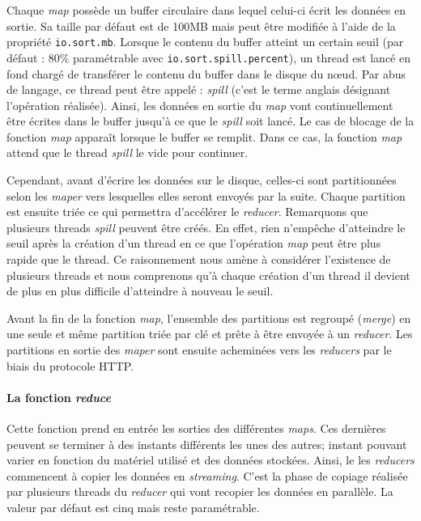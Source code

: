 \par Chaque \textit{map} possède un buffer circulaire dans lequel celui-ci écrit les données en sortie. Sa taille par défaut est de 100MB mais peut être modifiée à l'aide de la propriété \texttt{io.sort.mb}. Lorsque le contenu du buffer atteint un certain seuil (par défaut : 80\% paramétrable avec \texttt{io.sort.spill.percent}), un thread est lancé en fond chargé de transférer le contenu du buffer dans le disque du n\oe{}ud. Par abus de langage, ce thread peut être appelé : \textit{spill} (c'est le terme anglais désignant l'opération réalisée). Ainsi, les données en sortie du \textit{map} vont continuellement être écrites dans le buffer jusqu'à ce que le \textit{spill} soit lancé. Le cas de blocage de la fonction \textit{map} apparaît lorsque le buffer se remplit. Dans ce cas, la fonction \textit{map} attend que le thread \textit{spill} le vide pour continuer.

\par Cependant, avant d'écrire les données sur le disque, celles-ci sont partitionnées selon les \textit{maper} vers lesquelles elles seront envoyés par la suite. Chaque partition est ensuite triée ce qui permettra d'accélérer le \textit{reducer}. Remarquons que plusieurs threads \textit{spill} peuvent être créés. En effet, rien n'empêche d'atteindre le seuil après la création d'un thread en ce que l'opération \textit{map} peut être plus rapide que le thread. Ce raisonnement nous amène à considérer l'existence de plusieurs threads et nous comprenons qu'à chaque création d'un thread il devient de plus en plus difficile d'atteindre à nouveau le seuil.

\par Avant la fin de la fonction \textit{map}, l'ensemble des partitions est regroupé (\textit{merge}) en une seule et même partition triée par clé et prête à être envoyée à un \textit{reducer}. Les partitions en sortie des \textit{maper} sont ensuite acheminées vers les  \textit{reducers} par le biais du protocole HTTP.

\paragraph{La fonction \textit{reduce}} Cette fonction prend en entrée les sorties des différentes \textit{maps}. Ces dernières peuvent se terminer à des instants différents les unes des autres; instant pouvant varier en fonction du matériel utilisé et des données stockées. Ainsi, le les \textit{reducers} commencent à copier les données en \textit{streaming}. C'est la phase de copiage réalisée par plusieurs threads du \textit{reducer} qui vont recopier les données en parallèle. La valeur par défaut est cinq mais reste paramétrable.

